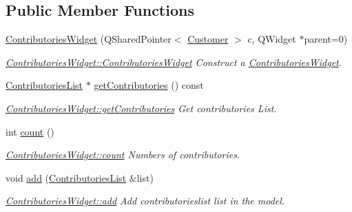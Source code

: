 \subsection*{Public Member Functions}
\begin{DoxyCompactItemize}
\item 
\hyperlink{classGui_1_1Widgets_1_1ContributoriesWidget_a5517afc134491eb118b9d183e94476bc}{Contributories\-Widget} (Q\-Shared\-Pointer$<$ \hyperlink{classModels_1_1Customer}{Customer} $>$ c, Q\-Widget $\ast$parent=0)
\begin{DoxyCompactList}\small\item\em \hyperlink{classGui_1_1Widgets_1_1ContributoriesWidget_a5517afc134491eb118b9d183e94476bc}{Contributories\-Widget\-::\-Contributories\-Widget} Construct a \hyperlink{classGui_1_1Widgets_1_1ContributoriesWidget}{Contributories\-Widget}. \end{DoxyCompactList}\item 
\hyperlink{classModels_1_1ContributoriesList}{Contributories\-List} $\ast$ \hyperlink{classGui_1_1Widgets_1_1ContributoriesWidget_a72c0f4a49aaafdf045154bafb1e76049}{get\-Contributories} () const 
\begin{DoxyCompactList}\small\item\em \hyperlink{classGui_1_1Widgets_1_1ContributoriesWidget_a72c0f4a49aaafdf045154bafb1e76049}{Contributories\-Widget\-::get\-Contributories} Get contributories List. \end{DoxyCompactList}\item 
int \hyperlink{classGui_1_1Widgets_1_1ContributoriesWidget_a7c9f1bfcac92d4813f1d43b46319042b}{count} ()
\begin{DoxyCompactList}\small\item\em \hyperlink{classGui_1_1Widgets_1_1ContributoriesWidget_a7c9f1bfcac92d4813f1d43b46319042b}{Contributories\-Widget\-::count} Numbers of contributories. \end{DoxyCompactList}\item 
void \hyperlink{classGui_1_1Widgets_1_1ContributoriesWidget_ae61498391d4aaf199bed8183961d515c}{add} (\hyperlink{classModels_1_1ContributoriesList}{Contributories\-List} \&list)
\begin{DoxyCompactList}\small\item\em \hyperlink{classGui_1_1Widgets_1_1ContributoriesWidget_ae61498391d4aaf199bed8183961d515c}{Contributories\-Widget\-::add} Add contributorieslist {\itshape list} in the model. \end{DoxyCompactList}\end{DoxyCompactItemize}


